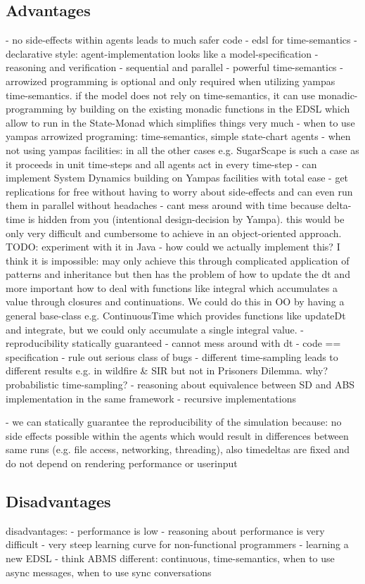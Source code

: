 \subsection{Advantages}
	- no side-effects within agents leads to much safer code
	- edsl for time-semantics
	- declarative style: agent-implementation looks like a model-specification
	- reasoning and verification
	- sequential and parallel
	- powerful time-semantics
	- arrowized programming is optional and only required when utilizing yampas time-semantics. if the model does not rely on time-semantics, it can use monadic-programming by building on the existing monadic functions in the EDSL which allow to run in the State-Monad which simplifies things very much
	- when to use yampas arrowized programing: time-semantics, simple state-chart agents 
	- when not using yampas facilities: in all the other cases e.g. SugarScape is such a case as it proceeds in unit time-steps and all agents act in every time-step
	- can implement System Dynamics building on Yampas facilities with total ease	
	- get replications for free without having to worry about side-effects and can even run them in parallel without headaches
	- cant mess around with time because delta-time is hidden from you (intentional design-decision by Yampa). this would be only very difficult and cumbersome to achieve in an object-oriented approach. TODO: experiment with it in Java - how could we actually implement this? I think it is impossible: may only achieve this through complicated application of patterns and inheritance but then has the problem of how to update the dt and more important how to deal with functions like integral which accumulates a value through closures and continuations. We could do this in OO by having a general base-class e.g. ContinuousTime which provides functions like updateDt and integrate, but we could only accumulate a single integral value.
	- reproducibility statically guaranteed
	- cannot mess around with dt
	- code == specification
	- rule out serious class of bugs
	- different time-sampling leads to different results e.g. in wildfire \& SIR but not in Prisoners Dilemma. why? probabilistic time-sampling?
	- reasoning about equivalence between SD and ABS implementation in the same framework
	- recursive implementations
	
	- we can statically guarantee the reproducibility of the simulation because: no side effects possible within the agents which would result in differences between same runs (e.g. file access, networking, threading), also timedeltas are fixed and do not depend on rendering performance or userinput	
	
\subsection{Disadvantages}
disadvantages:
	- performance is low
	- reasoning about performance is very difficult
	- very steep learning curve for non-functional programmers
	- learning a new EDSL
	- think ABMS different: continuous, time-semantics, when to use async messages, when to use sync conversations